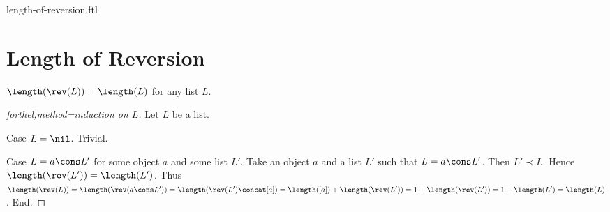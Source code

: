 \documentclass{naproche-library}
\begin{document}
\begin{smodule}{length-of-reversion.ftl}

  \section*{Length of Reversion}

  \begin{proposition}[forthel,id=LISTS_LENGTHREV_4512036658964875]
    $\length(\rev(L)) = \length(L)$ for any list $L$.
  \end{proposition}
  \begin{proof}[forthel,method=induction on $L$]
    Let $L$ be a list.
    
    Case $L = \nil$. Trivial.
    
    Case $L = a \cons L'$ for some object $a$ and some list $L'$.
      Take an object $a$ and a list $L'$ such that $L = a \cons L'$.
      Then $L' \prec L$.
      Hence $\length(\rev(L')) = \length(L')$.
      Thus $\length(\rev(L))
        = \length(\rev(a \cons L'))
        = \length(\rev(L') \concat [a])
        = \length([a]) + \length(\rev(L'))
        = 1 + \length(\rev(L'))
        = 1 + \length(L')
        = \length(L)$.
    End.
  \end{proof}
\end{smodule}
\end{document}
